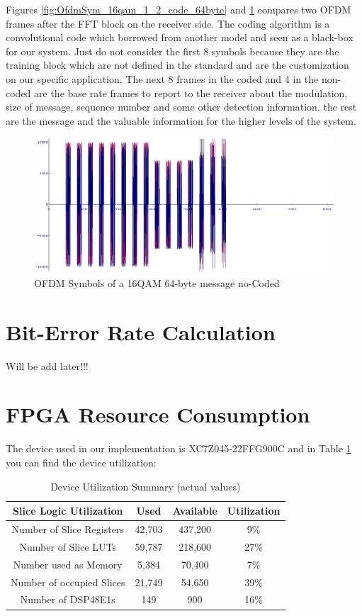 Figures \ref{fig:OfdmSym_16qam_1_2_code_64byte} and \ref{fig:OfdmSym_16qam_no_code_64byte} compares two OFDM frames after the FFT block on the receiver side. The coding algorithm is a convolutional code which borrowed from another model and seen as a black-box for our system. Just do not consider the first 8 symbols because they are the training block which are not defined in the standard and are the customization on our specific application. The next 8 frames in the coded and 4 in the non-coded are the base rate frames to report to the receiver about the modulation, size of message, sequence number and some other detection information. the rest are the message and the valuable information for the higher levels of the system.\\

\begin{figure}
\centering
\includegraphics[width=\textwidth]{content/fig/OfdmSym_16qam_no_code_64byte.JPG}
\caption{OFDM Symbols of a 16QAM 64-byte message no-Coded}
\label{fig:OfdmSym_16qam_no_code_64byte}
\end{figure}

\section{Bit-Error Rate Calculation}
Will be add later!!!


\section{FPGA Resource Consumption}
The device used in our implementation is  XC7Z045-22FFG900C and in Table \ref{table:DevUtil} you can find the device utilization:\\


\begin{table}
\centering
\vspace{0.5cm}
\begin{tabular}{c|c|c|c}
Slice Logic Utilization&Used&Available&Utilization\\ \hline
Number of Slice Registers&42,703&437,200&9\% \\
Number of Slice LUTs&59,787&218,600&27\% \\
Number used as Memory&5,384&70,400&7\% \\
Number of occupied Slices&21,749&54,650&39\% \\
Number of DSP48E1s&149&900&16\% \\
\end{tabular}

\caption{Device Utilization Summary (actual values)}
\label{table:DevUtil}
\end{table}

